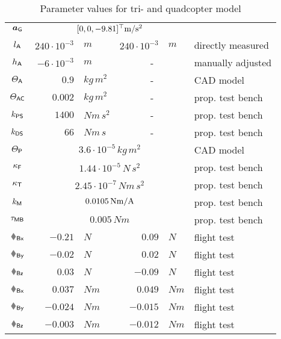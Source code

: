 \begin{table}
\begin{tabular}{crlrll}
  \\[1ex]
  $\boldsymbol{a}_{\mathsf{G}}$ & \multicolumn{4}{c}{$[0, 0, -9.81]^\top \text{m} / \text{s}^2$} & 
  \\[1ex]
  $l_{\mathsf{A}}$ & $ 240 \cdot 10^{-3}$&$\unit{m}$ & $240 \cdot 10^{-3}$&$\unit{m}$ & directly measured \\
  $h_{\mathsf{A}}$ & $  -6 \cdot 10^{-3}$&$\unit{m}$ & \multicolumn{2}{c}{-} & manually adjusted
  \\[1ex]
  $\varTheta_{\mathsf{A}}$  & $ 0.9$&$\unit{kg}\,\unit{m}^2$ & \multicolumn{2}{c}{-} & CAD model \\
  $\varTheta_{\mathsf{AC}}$ & $ 0.002$&$\unit{kg}\,\unit{m}^2$ & \multicolumn{2}{c}{-} & prop. test bench \\
  $k_{\mathsf{PS}}$ & $ 1400 $&$\unit{Nm}\,\unit{s}^2$ & \multicolumn{2}{c}{-} & prop. test bench\\
  $k_{\mathsf{DS}}$ & $ 66$&$\unit{Nm}\,\unit{s}$ & \multicolumn{2}{c}{-} & prop. test bench
  \\[1ex] 
  $\varTheta_{\mathsf{P}}$  & \multicolumn{4}{c}{$3.6 \cdot 10^{-5}\,\unit{kg}\,\unit{m}^2$} & CAD model \\
  $\kappa_{\mathsf{F}}$ & \multicolumn{4}{c}{$1.44 \cdot 10^{-5}\,\unit{N}\,\unit{s}^2$} & prop. test bench \\
  $\kappa_{\mathsf{T}}$ & \multicolumn{4}{c}{$2.45 \cdot 10^{-7}\,\unit{N}\unit{m}\,\unit{s}^2$} & prop. test bench \\
  $k_{\mathsf{M}}$ & \multicolumn{4}{c}{$0.0105\,\text{N}\text{m} / \text{A}$} & prop. test bench \\
  $\tau_{\mathsf{MB}}$ & \multicolumn{4}{c}{$0.005\,\unit{N}\unit{m}$} & prop. test bench
  \\[1ex]
  $\FBx$ & $-0.21$&$\unit{N}$ & $ 0.09$&$\unit{N}$ & flight test \\
  $\FBy$ & $-0.02$&$\unit{N}$ & $ 0.02$&$\unit{N}$ & flight test \\
  $\FBz$ & $ 0.03$&$\unit{N}$ & $ -0.09$&$\unit{N}$ & flight test \\
  $\tauBx$ & $ 0.037$&$\unit{N}\unit{m}$ & $ 0.049$&$\unit{N}\unit{m}$ & flight test \\
  $\tauBy$ & $-0.024$&$\unit{N}\unit{m}$ & $-0.015$&$\unit{N}\unit{m}$ & flight test \\
  $\tauBz$ & $-0.003$&$\unit{N}\unit{m}$ & $-0.012$&$\unit{N}\unit{m}$ & flight test \\
  \bottomrule
 \end{tabular}
 \caption{Parameter values for tri- and quadcopter model}
 \label{tab:ParamTriQuad}
\end{table}

